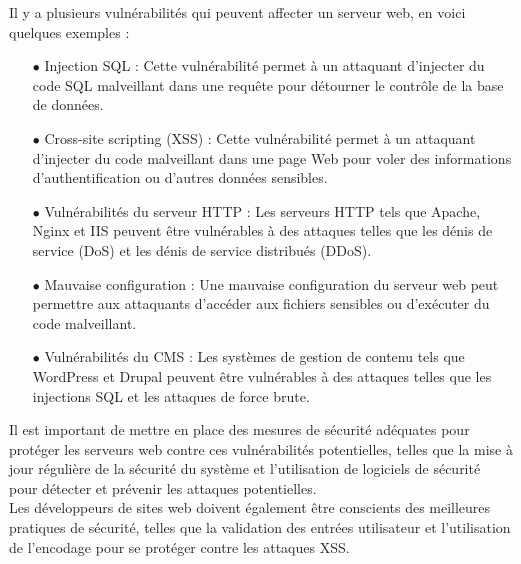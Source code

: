 Il y a plusieurs vulnérabilités qui peuvent affecter un serveur web, en voici quelques exemples :
\begin{itemize}
	 \item[$\bullet$] Injection SQL : Cette vulnérabilité permet à un attaquant d'injecter du code SQL malveillant dans une requête pour détourner le contrôle de la base de données.
	 \item[$\bullet$] Cross-site scripting (XSS) : Cette vulnérabilité permet à un attaquant d'injecter du code malveillant dans une page Web pour voler des informations d'authentification ou d'autres données sensibles.
	 \item[$\bullet$] Vulnérabilités du serveur HTTP : Les serveurs HTTP tels que Apache, Nginx et IIS peuvent être vulnérables à des attaques telles que les dénis de service (DoS) et les dénis de service distribués (DDoS).
	\item[$\bullet$] Mauvaise configuration : Une mauvaise configuration du serveur web peut permettre aux attaquants d'accéder aux fichiers sensibles ou d'exécuter du code malveillant.
	\item[$\bullet$] Vulnérabilités du CMS : Les systèmes de gestion de contenu tels que WordPress et Drupal peuvent être vulnérables à des attaques telles que les injections SQL et les attaques de force brute.
	 
\end{itemize}

Il est important de mettre en place des mesures de sécurité adéquates pour protéger les serveurs web contre ces vulnérabilités potentielles, telles que la mise à jour régulière de la sécurité du système et l'utilisation de logiciels de sécurité pour détecter et prévenir les attaques potentielles. 
\\Les développeurs de sites web doivent également être conscients des meilleures pratiques de sécurité, telles que la validation des entrées utilisateur et l'utilisation de l'encodage pour se protéger contre les attaques XSS.\\
